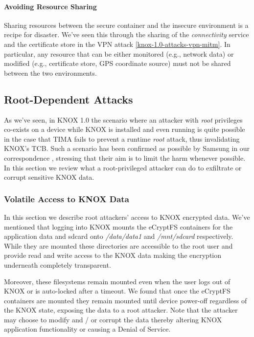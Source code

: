 \documentclass[11pt]{article}
\begin{document}
\paragraph{Avoiding Resource Sharing} \label{knox-1.0-lesson-resource-sharing}
Sharing resources between the secure container and the insecure environment is a recipe for disaster. We've seen this through the sharing of the \emph{connectivity} 
service and the certificate store in the VPN attack \ref{knox-1.0-attacks-vpn-mitm}. In particular, any resource that can be either monitored (e.g., network data) or modified 
(e.g., certificate store, GPS coordinate source) must not be shared between the two environments.

\subsection{Root-Dependent Attacks} \label{knox-1.0-root-attacks}
As we've seen, in KNOX 1.0 the scenario where an attacker with \emph{root} privileges co-exists on a device while KNOX is installed and even running is 
quite possible in the case that TIMA fails to prevent a runtime \emph{root} attack, thus invalidating KNOX's TCB. 
Such a scenario has been confirmed as possible by Samsung in our correspondence \cite{SamsungCorrespondence}, stressing that their aim is to 
limit the harm whenever possible.
In this section we review what a root-privileged attacker can do to exfiltrate or corrupt sensitive KNOX data. 

\subsubsection{Volatile Access to KNOX Data}
In this section we describe root attackers' access to KNOX encrypted data. 
We've mentioned that logging into KNOX mounts the eCryptFS containers for the application data and sdcard onto \emph{/data/data1} and 
\emph{/mnt/sdcard} respectively. While they are mounted these directories are accessible to the root user and provide 
read and write access to the KNOX data making the encryption underneath completely transparent.

Moreover, these filesystems remain mounted even when the user logs out of KNOX or is auto-locked after a timeout. 
We found that once the eCryptFS containers are mounted they remain mounted until device power-off regardless of the KNOX state, 
exposing the data to a root attacker.
Note that the attacker may choose to modify and / or corrupt the data thereby altering KNOX application functionality or causing a Denial of Service.
\end{document}
